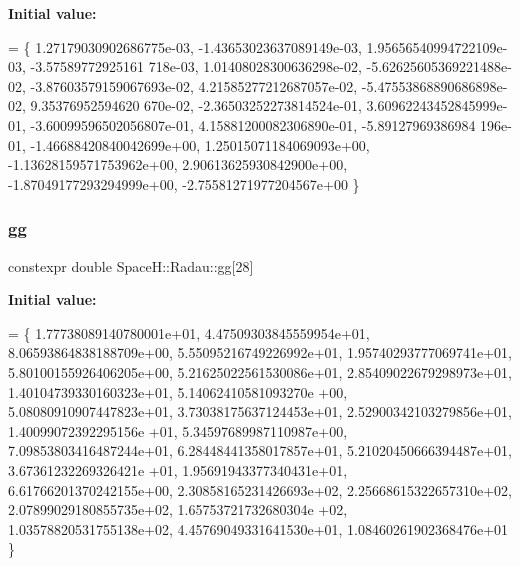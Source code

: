 {\bfseries Initial value\+:}
\begin{DoxyCode}
=
        \{
             1.27179030902686775e-03, -1.43653023637089149e-03,  1.95656540994722109e-03, -3.57589772925161
      718e-03,  1.01408028300636298e-02, -5.62625605369221488e-02,
            -3.87603579159067693e-02,  4.21585277212687057e-02, -5.47553868890686898e-02,  9.35376952594620
      670e-02, -2.36503252273814524e-01,
             3.60962243452845999e-01, -3.60099596502056807e-01,  4.15881200082306890e-01, -5.89127969386984
      196e-01,
            -1.46688420840042699e+00,  1.25015071184069093e+00, -1.13628159571753962e+00,
             2.90613625930842900e+00, -1.87049177293294999e+00,
            -2.75581271977204567e+00
        \}
\end{DoxyCode}
\mbox{\label{namespace_space_h_1_1_radau_a4b01e8b6450f665f02918969259eea09}} 
\subsubsection{\texorpdfstring{gg}{gg}}
{\footnotesize\ttfamily constexpr double Space\+H\+::\+Radau\+::gg\mbox{[}28\mbox{]}}

{\bfseries Initial value\+:}
\begin{DoxyCode}
=
        \{
            1.77738089140780001e+01,
            4.47509303845559954e+01, 8.06593864838188709e+00,
            5.55095216749226992e+01, 1.95740293777069741e+01, 5.80100155926406205e+00,
            5.21625022561530086e+01, 2.85409022679298973e+01, 1.40104739330160323e+01, 5.14062410581093270e
      +00,
            5.08080910907447823e+01, 3.73038175637124453e+01, 2.52900342103279856e+01, 1.40099072392295156e
      +01, 5.34597689987110987e+00,
            7.09853803416487244e+01, 6.28448441358017857e+01, 5.21020450666394487e+01, 3.67361232269326421e
      +01, 1.95691943377340431e+01, 6.61766201370242155e+00,
            2.30858165231426693e+02, 2.25668615322657310e+02, 2.07899029180855735e+02, 1.65753721732680304e
      +02, 1.03578820531755138e+02, 4.45769049331641530e+01, 1.08460261902368476e+01
        \}
\end{DoxyCode}
\mbox{\label{namespace_space_h_1_1_radau_ace842233b380d237a5275cf16462ceeb}} 
